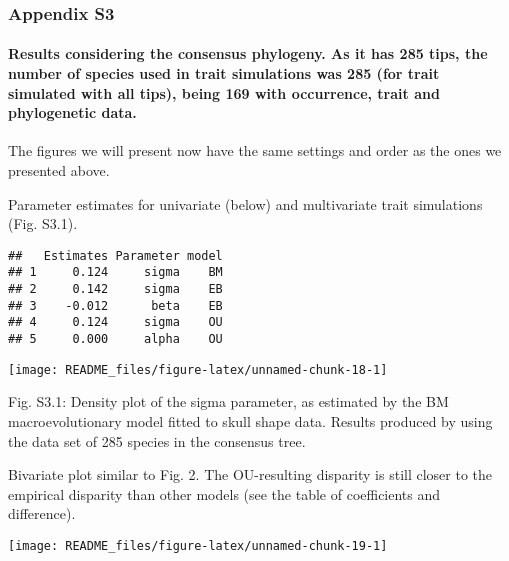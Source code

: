 \documentclass[
]{article}
\begin{document}
\newpage

\hypertarget{appendix-s3}{%
\subsubsection{Appendix S3}\label{appendix-s3}}

\hypertarget{results-considering-the-consensus-phylogeny.-as-it-has-285-tips-the-number-of-species-used-in-trait-simulations-was-285-for-trait-simulated-with-all-tips-being-169-with-occurrence-trait-and-phylogenetic-data.}{%
\paragraph{Results considering the consensus phylogeny. As it has 285
tips, the number of species used in trait simulations was 285 (for trait
simulated with all tips), being 169 with occurrence, trait and
phylogenetic
data.}\label{results-considering-the-consensus-phylogeny.-as-it-has-285-tips-the-number-of-species-used-in-trait-simulations-was-285-for-trait-simulated-with-all-tips-being-169-with-occurrence-trait-and-phylogenetic-data.}}

The figures we will present now have the same settings and order as the
ones we presented above.

Parameter estimates for univariate (below) and multivariate trait
simulations (Fig. S3.1).

\begin{verbatim}
##   Estimates Parameter model
## 1     0.124     sigma    BM
## 2     0.142     sigma    EB
## 3    -0.012      beta    EB
## 4     0.124     sigma    OU
## 5     0.000     alpha    OU
\end{verbatim}

\begin{center}\texttt{[image: README\_files/figure-latex/unnamed-chunk-18-1]} \end{center}

Fig. S3.1: Density plot of the sigma parameter, as estimated by the BM
macroevolutionary model fitted to skull shape data. Results produced by
using the data set of 285 species in the consensus tree.

Bivariate plot similar to Fig. 2. The OU-resulting disparity is still
closer to the empirical disparity than other models (see the table of
coefficients and difference).

\begin{center}\texttt{[image: README\_files/figure-latex/unnamed-chunk-19-1]} \end{center}
\end{document}
